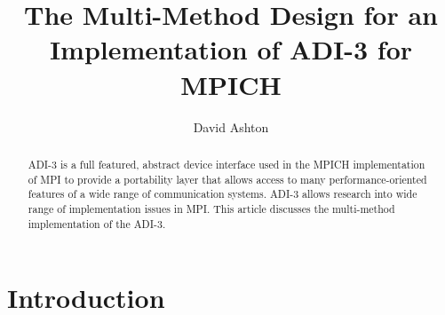 \documentclass[dvipdfm,twoside,11pt]{article}
\begin{document}
%
\title{The Multi-Method Design for an Implementation of ADI-3 for MPICH}
\author{David Ashton}
\maketitle

{}
\setcounter{page}{0}
\cleardoublepage
\pagestyle{plain}
\begingroup
\parskip=0pt
\tableofcontents
\bigskip
\endgroup
\bigskip

\clearpage

\setcounter{page}{1}

\begin{abstract}
ADI-3 is a full featured, abstract device interface used in the MPICH
implementation of MPI to provide a portability layer that allows
access to many performance-oriented features of a wide range of
communication systems.  ADI-3 allows research into wide range of
implementation issues in MPI.  This article discusses the multi-method
implementation of the ADI-3.
\end{abstract}

\section{Introduction}
\end{document}
